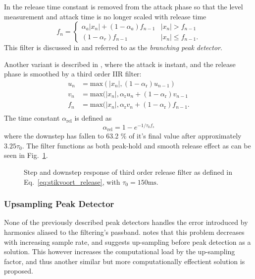 \documentclass[../main2.tex]{subfiles}
\providecommand{\rootdir}{..}
\begin{document}
In \cite{zolzer2008digital} the release time constant is removed from the attack phase so that the level measurement and attack time is no longer scaled with release time
\begin{equation}
f_n = \begin{cases}
    \alpha_{a} |x_n| + (1-\alpha_{a}) f_{n-1} 	& |x_n| > f_{n-1} \\
    (1-\alpha_{r}) f_{n-1} 					& |x_n| \leq f_{n-1}.
\end{cases}
\end{equation}
This filter is discussed in \cite{reiss2012tutorial} and referred to as the \emph{branching peak detector}.

Another variant is described in \cite{stikvoort1986digital}, where the attack is instant, and the release phase is smoothed by a third order IIR filter:\begin{equation}\label{eq:stikvoort_release}
\begin{split}
u_n &= \text{max}(|x_n|, (1-\alpha_{\text{r}}) u_{n-1}) \\
v_n &= \text{max}(|x_n|, \alpha_{\text{r}} u_n + (1-\alpha_{\text{r}}) v_{n-1} \\
f_n &= \text{max}(|x_n|, \alpha_{\text{r}} v_n + (1-\alpha_{\text{r}}) f_{n-1}. \\
\end{split}
\end{equation}
The time constant $\alpha_{\text{rel}}$ is defined as
\begin{equation}
\alpha_\text{rel} = 1-e^{-1/\tau_0 f_s}
\end{equation}
where the downstep has fallen to 63.2 \% of it's final value after approximately $3.25 \tau_0$. The filter functions as both peak-hold and smooth release effect as can be seen in Fig.~\ref{fig:step_stikvoort_release}.
\begin{figure}
\centerline{}
\caption{Step and downstep response of third order release filter as defined in Eq.~\eqref{eq:stikvoort_release}, with $\tau_0 = 150 \text{ms}$.}
\label{fig:step_stikvoort_release}
\end{figure}

\subsubsection{Upsampling Peak Detector}
None of the previously described peak detectors handles the error introduced by harmonics aliased to the filtering's passband. \cite{frindle1996implementation} notes that this problem decreases with increasing sample rate, and suggests up-sampling before peak detection as a solution. This however increases the computational load by the up-sampling factor, and thus another similar but more computationally effectient solution is proposed.
\end{document}
